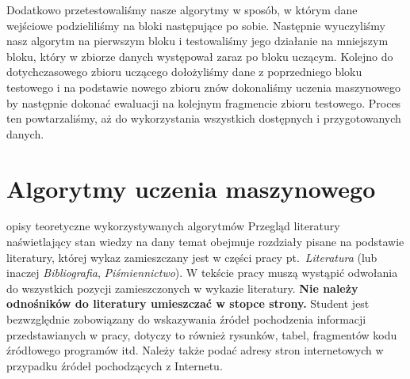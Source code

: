 Dodatkowo przetestowaliśmy nasze algorytmy w sposób, w którym dane wejściowe podzieliliśmy na bloki następujące po sobie. Następnie wyuczyliśmy nasz algorytm na pierwszym bloku i testowaliśmy jego działanie na mniejszym bloku, który w zbiorze danych występował zaraz po bloku uczącym. Kolejno do dotychczasowego zbioru uczącego dołożyliśmy dane z poprzedniego bloku testowego i na podstawie nowego zbioru znów dokonaliśmy uczenia maszynowego by następnie dokonać ewaluacji na kolejnym fragmencie zbioru testowego. Proces ten powtarzaliśmy, aż do wykorzystania wszystkich dostępnych i przygotowanych danych.

\section{Algorytmy uczenia maszynowego}
opisy teoretyczne wykorzystywanych algorytmów
Przegląd literatury naświetlający stan wiedzy na dany temat obejmuje rozdziały pisane na podstawie
literatury, której wykaz zamieszczany jest w części pracy pt.~\emph{Literatura} (lub inaczej \emph{Bibliografia},
\emph{Piśmiennictwo}). W tekście pracy muszą wystąpić odwołania do wszystkich pozycji zamieszczonych w
wykazie literatury. \textbf{Nie należy odnośników do literatury umieszczać w stopce strony.} Student jest
bezwzględnie zobowiązany do wskazywania źródeł pochodzenia informacji przedstawianych w pracy,
dotyczy to również rysunków, tabel, fragmentów kodu źródłowego programów itd. Należy także podać
adresy stron internetowych w przypadku źródeł pochodzących z Internetu. 


